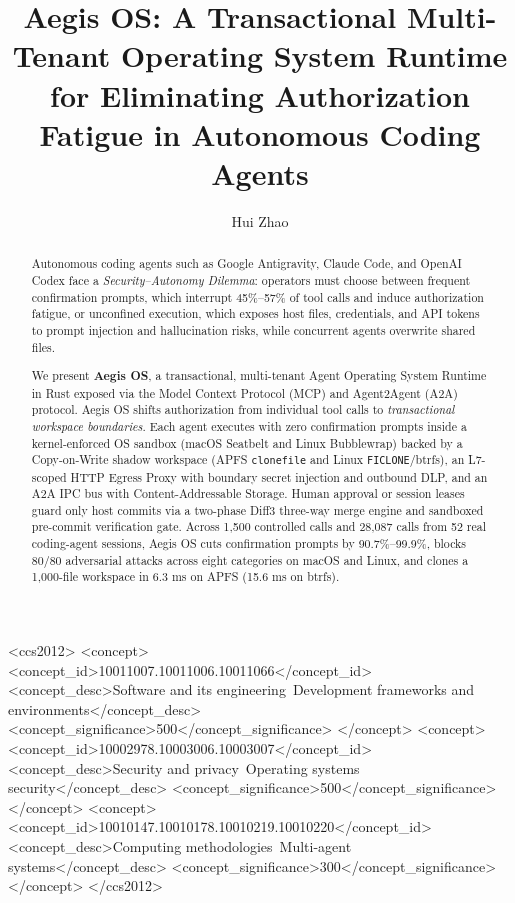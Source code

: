 \documentclass[acmsmall,screen,review]{acmart}
\begin{document}
\title{Aegis OS: A Transactional Multi-Tenant Operating System Runtime for Eliminating Authorization Fatigue in Autonomous Coding Agents}

\author{Hui Zhao}


\begin{abstract}
Autonomous coding agents such as Google Antigravity, Claude Code, and OpenAI Codex face a \emph{Security--Autonomy Dilemma}: operators must choose between frequent confirmation prompts, which interrupt 45\%--57\% of tool calls and induce authorization fatigue, or unconfined execution, which exposes host files, credentials, and API tokens to prompt injection and hallucination risks, while concurrent agents overwrite shared files.

We present \textbf{Aegis OS}, a transactional, multi-tenant Agent Operating System Runtime in Rust exposed via the Model Context Protocol (MCP) and Agent2Agent (A2A) protocol. Aegis OS shifts authorization from individual tool calls to \emph{transactional workspace boundaries}. Each agent executes with zero confirmation prompts inside a kernel-enforced OS sandbox (macOS Seatbelt and Linux Bubblewrap) backed by a Copy-on-Write shadow workspace (APFS \texttt{clonefile} and Linux \texttt{FICLONE}/btrfs), an L7-scoped HTTP Egress Proxy with boundary secret injection and outbound DLP, and an A2A IPC bus with Content-Addressable Storage. Human approval or session leases guard only host commits via a two-phase Diff3 three-way merge engine and sandboxed pre-commit verification gate. Across 1,500 controlled calls and 28,087 calls from 52 real coding-agent sessions, Aegis OS cuts confirmation prompts by 90.7\%--99.9\%, blocks 80/80 adversarial attacks across eight categories on macOS and Linux, and clones a 1,000-file workspace in 6.3 ms on APFS (15.6 ms on btrfs).
\end{abstract}

\begin{CCSXML}
<ccs2012>
   <concept>
       <concept_id>10011007.10011006.10011066</concept_id>
       <concept_desc>Software and its engineering~Development frameworks and environments</concept_desc>
       <concept_significance>500</concept_significance>
   </concept>
   <concept>
       <concept_id>10002978.10003006.10003007</concept_id>
       <concept_desc>Security and privacy~Operating systems security</concept_desc>
       <concept_significance>500</concept_significance>
   </concept>
   <concept>
       <concept_id>10010147.10010178.10010219.10010220</concept_id>
       <concept_desc>Computing methodologies~Multi-agent systems</concept_desc>
       <concept_significance>300</concept_significance>
   </concept>
</ccs2012>
\end{CCSXML}
\end{document}
